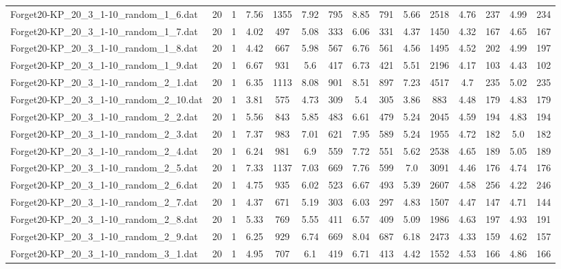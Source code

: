 \begin{table}[!ht]
{\begin{tabular}{lcccccccccccccc}
Forget20-KP\_20\_3\_1-10\_random\_1\_6.dat & 20 & 1 & 7.56 & 1355 & 7.92 & 795 & 8.85 & 791 & 5.66 & 2518 & 4.76 & 237 & 4.99 & 234 \\
Forget20-KP\_20\_3\_1-10\_random\_1\_7.dat & 20 & 1 & 4.02 & 497 & 5.08 & 333 & 6.06 & 331 & 4.37 & 1450 & 4.32 & 167 & 4.65 & 167 \\
Forget20-KP\_20\_3\_1-10\_random\_1\_8.dat & 20 & 1 & 4.42 & 667 & 5.98 & 567 & 6.76 & 561 & 4.56 & 1495 & 4.52 & 202 & 4.99 & 197 \\
Forget20-KP\_20\_3\_1-10\_random\_1\_9.dat & 20 & 1 & 6.67 & 931 & 5.6 & 417 & 6.73 & 421 & 5.51 & 2196 & 4.17 & 103 & 4.43 & 102 \\
Forget20-KP\_20\_3\_1-10\_random\_2\_1.dat & 20 & 1 & 6.35 & 1113 & 8.08 & 901 & 8.51 & 897 & 7.23 & 4517 & 4.7 & 235 & 5.02 & 235 \\
Forget20-KP\_20\_3\_1-10\_random\_2\_10.dat & 20 & 1 & 3.81 & 575 & 4.73 & 309 & 5.4 & 305 & 3.86 & 883 & 4.48 & 179 & 4.83 & 179 \\
Forget20-KP\_20\_3\_1-10\_random\_2\_2.dat & 20 & 1 & 5.56 & 843 & 5.85 & 483 & 6.61 & 479 & 5.24 & 2045 & 4.59 & 194 & 4.83 & 194 \\
Forget20-KP\_20\_3\_1-10\_random\_2\_3.dat & 20 & 1 & 7.37 & 983 & 7.01 & 621 & 7.95 & 589 & 5.24 & 1955 & 4.72 & 182 & 5.0 & 182 \\
Forget20-KP\_20\_3\_1-10\_random\_2\_4.dat & 20 & 1 & 6.24 & 981 & 6.9 & 559 & 7.72 & 551 & 5.62 & 2538 & 4.65 & 189 & 5.05 & 189 \\
Forget20-KP\_20\_3\_1-10\_random\_2\_5.dat & 20 & 1 & 7.33 & 1137 & 7.03 & 669 & 7.76 & 599 & 7.0 & 3091 & 4.46 & 176 & 4.74 & 176 \\
Forget20-KP\_20\_3\_1-10\_random\_2\_6.dat & 20 & 1 & 4.75 & 935 & 6.02 & 523 & 6.67 & 493 & 5.39 & 2607 & 4.58 & 256 & 4.22 & 246 \\
Forget20-KP\_20\_3\_1-10\_random\_2\_7.dat & 20 & 1 & 4.37 & 671 & 5.19 & 303 & 6.03 & 297 & 4.83 & 1507 & 4.47 & 147 & 4.71 & 144 \\
Forget20-KP\_20\_3\_1-10\_random\_2\_8.dat & 20 & 1 & 5.33 & 769 & 5.55 & 411 & 6.57 & 409 & 5.09 & 1986 & 4.63 & 197 & 4.93 & 191 \\
Forget20-KP\_20\_3\_1-10\_random\_2\_9.dat & 20 & 1 & 6.25 & 929 & 6.74 & 669 & 8.04 & 687 & 6.18 & 2473 & 4.33 & 159 & 4.62 & 157 \\
Forget20-KP\_20\_3\_1-10\_random\_3\_1.dat & 20 & 1 & 4.95 & 707 & 6.1 & 419 & 6.71 & 413 & 4.42 & 1552 & 4.53 & 166 & 4.86 & 166 \\

\end{tabular}}
\end{table}
